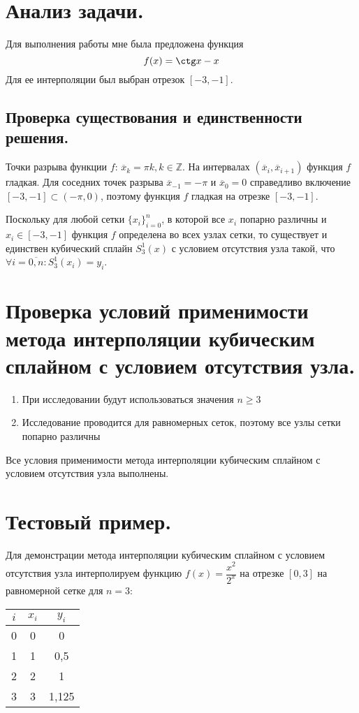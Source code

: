 \documentclass[a4paper, 12pt]{article}
\begin{document}
	\section{Анализ задачи.}
	
	Для выполнения работы мне была предложена функция
	\begin{equation}
		f(x)=\ctg x - x
	\end{equation}
	Для ее интерполяции был выбран отрезок $[-3,-1]$.
	
	\subsection{Проверка существования и единственности решения.}
	
	Точки разрыва функции $f$: $\overline{x}_k=\pi k,k\in\mathbb{Z}$. На интервалах $(\overline{x}_{i}, \overline{x}_{i+1})$ функция $f$ гладкая. Для соседних точек разрыва $\overline{x}_{-1}=-\pi$ и $\overline{x}_{0}=0$ справедливо включение $[-3,-1]\subset(-\pi,0)$, поэтому функция $f$ гладкая на отрезке $[-3,-1]$.
	
	Поскольку для любой сетки $\{x_i\}_{i=0}^n$, в которой все $x_i$ попарно различны и $x_i\in[-3,-1]$ функция $f$ определена во всех узлах сетки, то существует и единствен кубический сплайн $S_3^1(x)$ с условием отсутствия узла такой, что $\forall i=\overline{0,n} : S_3^1(x_i)=y_i$.
	
	\section{Проверка условий применимости метода интерполяции кубическим сплайном с условием отсутствия узла.}
	
	\begin{enumerate}
		\item При исследовании будут использоваться значения $n\geq 3$
		\item Исследование проводится для равномерных сеток, поэтому все узлы сетки попарно различны
	\end{enumerate}
	
	Все условия применимости метода интерполяции кубическим сплайном с условием отсутствия узла выполнены.
	
	\section{Тестовый пример.}
	
	Для демонстрации метода интерполяции кубическим сплайном с условием отсутствия узла интерполируем функцию $f(x)=\dfrac{x^2}{2^x}$ на отрезке $[0,3]$ на равномерной сетке для $n=3$:
	\begin{center}
		\begin{tabular}{ | c | c | c | }
			\hline
			$i$ & $x_i$ & $y_i$ \\ \hline
			0 & 0 & 0 \\ \hline
			1 & 1 & 0,5 \\ \hline
			2 & 2 & 1 \\ \hline
			3 & 3 & 1,125 \\
			\hline
		\end{tabular}
	\end{center}
	
\end{document}
